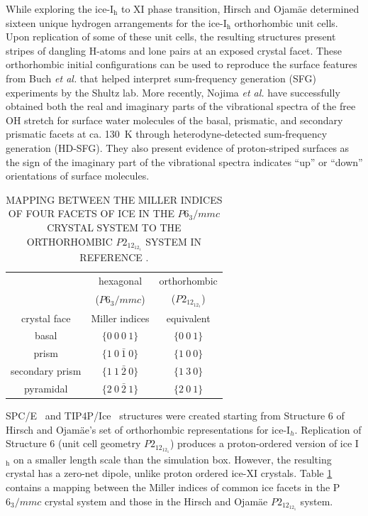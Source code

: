 While exploring the ice-I$_\mathrm{h}$ to XI phase transition, Hirsch
and Ojam\"{a}e determined sixteen unique hydrogen arrangements for the
ice-I$_\mathrm{h}$ orthorhombic unit cells.\cite{Hirsch2004} Upon
replication of some of these unit cells, the resulting structures
present stripes of dangling H-atoms and lone pairs at an exposed
crystal facet. These orthorhombic initial configurations can be used
to reproduce the surface features from Buch \textit{et
  al.}\cite{Buch2008} that helped interpret sum-frequency generation
(SFG) experiments by the Shultz lab.\cite{Groenzin07} More recently,
Nojima \textit{et al.}\cite{Nojima2017} have successfully obtained
both the real and imaginary parts of the vibrational spectra of the
free OH stretch for surface water molecules of the basal, prismatic,
and secondary prismatic facets at ca. 130~K through
heterodyne-detected sum-frequency generation (HD-SFG). They also
present evidence of proton-striped surfaces as the sign of the
imaginary part of the vibrational spectra indicates ``up'' or ``down''
orientations of surface molecules.

\begin{table}[h]
\centering
  \caption{MAPPING BETWEEN THE MILLER INDICES OF FOUR FACETS OF ICE IN
    THE $P6_3/mmc$ CRYSTAL SYSTEM TO THE ORTHORHOMBIC $P2_12_12_1$
    SYSTEM IN REFERENCE  \protect\citep{Hirsch04}.}
\label{tab:equiv}
\begin{tabular}{|ccc|} \hline
 & hexagonal & orthorhombic \\
 & ($P6_3/mmc$) & ($P2_12_12_1$) \\
 crystal face  & Miller indices & equivalent \\ \hline
basal & $\{0~0~0~1\}$ & $\{0~0~1\}$ \\
prism & $\{1~0~\bar{1}~0\}$ & $\{1~0~0\}$ \\
secondary prism & $\{1~1~\bar{2}~0\}$ & $\{1~3~0\}$ \\
pyramidal & $\{2~0~\bar{2}~1\}$ & $\{2~0~1\}$ \\ \hline
\end{tabular}
\end{table}

SPC/E~\cite{Berendsen1987} and TIP4P/Ice~\cite{Abascal2005} structures
were created starting from Structure 6 of Hirsch and Ojam\"{a}e's set
of orthorhombic representations for ice-I$_{h}$.\cite{Hirsch2004}
Replication of Structure 6 (unit cell geometry $P2_12_12_1$) produces a proton-ordered
version of ice I$_\mathrm{h}$ on a smaller length scale than the
simulation box. However, the resulting crystal has a zero-net dipole,
unlike proton ordered ice-XI crystals. Table \ref{tab:equiv} contains a
mapping between the Miller indices of common ice facets in the
P$6_3/mmc$ crystal system and those in the Hirsch and Ojam\"{a}e
$P2_12_12_1$ system.

